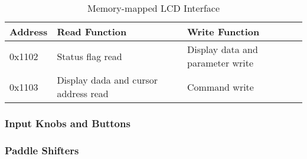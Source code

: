 \begin{table}
\begin{centering}
\caption{Memory-mapped LCD Interface}

\par\end{centering}

\centering{}\begin{tabular}{|l|l|l|}
\hline 
Address  & Read Function  & Write Function\tabularnewline
\hline
\hline 
0x1102  & Status flag read  & Display data and parameter write\tabularnewline
\hline 
0x1103  & Display dada and cursor address read  & Command write\tabularnewline
\hline
\end{tabular}
\end{table}

\subsubsection{Input Knobs and Buttons}


\subsubsection{Paddle Shifters}